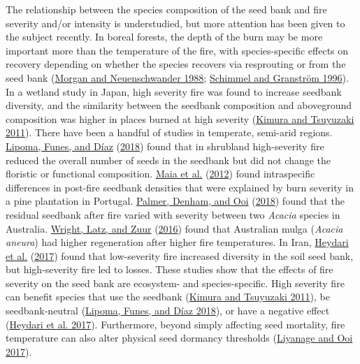 \documentclass[
  12pt,
]{article}
\begin{document}
The relationship between the species composition of the seed bank and
fire severity and/or intensity is understudied, but more attention has
been given to the subject recently. In boreal forests, the depth of the
burn may be more important more than the temperature of the fire, with
species-specific effects on recovery depending on whether the species
recovers via resprouting or from the seed bank
(\protect\hyperlink{ref-Morgan1988}{Morgan and Neuenschwander 1988};
\protect\hyperlink{ref-Schimmel1996}{Schimmel and Granström 1996}). In a
wetland study in Japan, high severity fire was found to increase
seedbank diversity, and the similarity between the seedbank composition
and aboveground composition was higher in places burned at high severity
(\protect\hyperlink{ref-Kimura2011}{Kimura and Tsuyuzaki 2011}). There
have been a handful of studies in temperate, semi-arid regions.
\protect\hyperlink{ref-Lipoma2018}{Lipoma, Funes, and Díaz}
(\protect\hyperlink{ref-Lipoma2018}{2018}) found that in shrubland
high-severity fire reduced the overall number of seeds in the seedbank
but did not change the floristic or functional composition.
\protect\hyperlink{ref-Maia2012}{Maia et al.}
(\protect\hyperlink{ref-Maia2012}{2012}) found intraspecific differences
in post-fire seedbank densities that were explained by burn severity in
a pine plantation in Portugal.
\protect\hyperlink{ref-Palmer2018}{Palmer, Denham, and Ooi}
(\protect\hyperlink{ref-Palmer2018}{2018}) found that the residual
seedbank after fire varied with severity between two \emph{Acacia}
species in Australia. \protect\hyperlink{ref-Wright2016}{Wright, Latz,
and Zuur} (\protect\hyperlink{ref-Wright2016}{2016}) found that
Australian mulga (\emph{Acacia aneura}) had higher regeneration after
higher fire temperatures. In Iran,
\protect\hyperlink{ref-Heydari2017}{Heydari et al.}
(\protect\hyperlink{ref-Heydari2017}{2017}) found that low-severity fire
increased diversity in the soil seed bank, but high-severity fire led to
losses. These studies show that the effects of fire severity on the seed
bank are ecosystem- and species-specific. High severity fire can benefit
species that use the seedbank (\protect\hyperlink{ref-Kimura2011}{Kimura
and Tsuyuzaki 2011}), be seedbank-neutral
(\protect\hyperlink{ref-Lipoma2018}{Lipoma, Funes, and Díaz 2018}), or
have a negative effect (\protect\hyperlink{ref-Heydari2017}{Heydari et
al. 2017}). Furthermore, beyond simply affecting seed mortality, fire
temperature can also alter physical seed dormancy thresholds
(\protect\hyperlink{ref-Liyanage2017}{Liyanage and Ooi 2017}).
\end{document}
